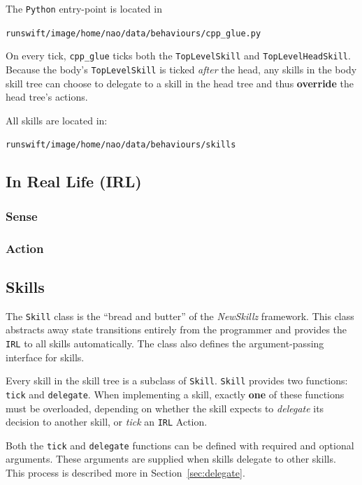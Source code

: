 The \verb!Python! entry-point is located in

\texttt{runswift/image/home/nao/data/behaviours/cpp\_glue.py}

On every tick, \texttt{cpp\_glue} ticks both the \texttt{TopLevelSkill} and \texttt{TopLevelHeadSkill}. Because the body's \texttt{TopLevelSkill} is ticked \textit{after} the head, any skills in the body skill tree can choose to delegate to a skill in the head tree and thus \textbf{override} the head tree's actions.

All skills are located in:

\texttt{runswift/image/home/nao/data/behaviours/skills}

\subsection{In Real Life (IRL)}

\subsubsection{Sense}

\subsubsection{Action}

\subsection{Skills}

The \texttt{Skill} class is the ``bread and butter'' of the \textit{NewSkillz} framework. This class abstracts away state transitions entirely from the programmer and provides the \texttt{IRL} to all skills automatically. The class also defines the argument-passing interface for skills.

Every skill in the skill tree is a subclass of \texttt{Skill}. \texttt{Skill} provides two functions: \texttt{tick} and \texttt{delegate}. When implementing a skill, exactly \textbf{one} of these functions must be overloaded, depending on whether the skill expects to \textit{delegate} its decision to another skill, or \textit{tick} an \texttt{IRL} Action.

Both the \texttt{tick} and \texttt{delegate} functions can be defined with required and optional arguments. These arguments are supplied when skills delegate to other skills. This process is described more in Section~\ref{sec:delegate}.

